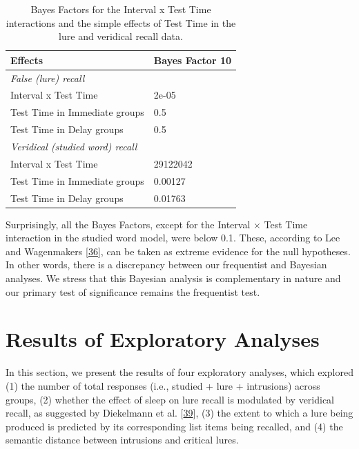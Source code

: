 \documentclass[
]{article}
\begin{document}
\begin{table}[H]

\caption{\label{tab:table5}Bayes Factors for the Interval x Test Time interactions and the simple effects of Test Time in the lure and veridical recall data.}
\centering
\begin{tabular}[t]{ll}
\toprule
Effects & Bayes Factor 10\\
\midrule
\em{False (lure) recall} & \em{}\\
Interval x Test Time & 2e-05\\
Test Time in Immediate groups & 0.5\\
Test Time in Delay groups & 0.5\\
\em{Veridical (studied word) recall} & \em{}\\
\addlinespace
Interval x Test Time & 29122042\\
Test Time in Immediate groups & 0.00127\\
Test Time in Delay groups & 0.01763\\
\bottomrule
\end{tabular}
\end{table}

Surprisingly, all the Bayes Factors, except for the Interval \(\times\) Test Time interaction in the studied word model, were below 0.1. These, according to Lee and Wagenmakers {[}\protect\hyperlink{ref-lee2014a}{36}{]}, can be taken as extreme evidence for the null hypotheses. In other words, there is a discrepancy between our frequentist and Bayesian analyses. We stress that this Bayesian analysis is complementary in nature and our primary test of significance remains the frequentist test.

\hypertarget{results-of-exploratory-analyses}{%
\section{Results of Exploratory Analyses}\label{results-of-exploratory-analyses}}

In this section, we present the results of four exploratory analyses, which explored (1) the number of total responses (i.e., studied + lure + intrusions) across groups, (2) whether the effect of sleep on lure recall is modulated by veridical recall, as suggested by Diekelmann et al. {[}\protect\hyperlink{ref-diekelmann2010a}{39}{]}, (3) the extent to which a lure being produced is predicted by its corresponding list items being recalled, and (4) the semantic distance between intrusions and critical lures.
\end{document}
